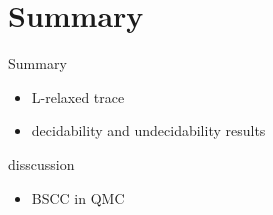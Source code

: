 \section{Summary}
\begin{frame}{Summary}
  \begin{itemize}
    \item L-relaxed trace
    \item decidability and undecidability results
  \end{itemize}
\end{frame}
\begin{frame}{disscussion}
  \begin{itemize}
    \item BSCC in QMC
  \end{itemize}
\end{frame}